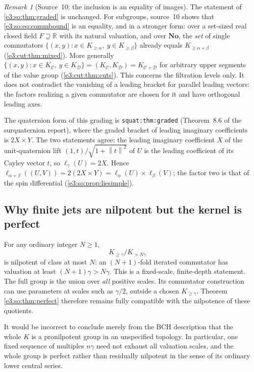\documentclass[11pt,letterpaper]{article}
\numberwithin{equation}{section}
\theoremstyle{definition}
\theoremstyle{remark}
\newtheorem{remark}[remark]{Remark}
\newcommand{\No}{\mathbf{No}}
\newcommand{\R}{\mathbb R}
\newcommand{\norm}[1]{\left\lVert#1\right\rVert}
\newcommand{\comm}[2]{\left(#1,#2\right)}
\newcommand{\commset}[2]{\{\comm{x}{y}:x\in #1,\ y\in #2\}}
\begin{document}
\begin{remark}[Source~10: the inclusion is an equality of images]\label{e3:cut:rem:gradedequality}
The statement of \cref{e3:so:thm:graded} is unchanged. For subgroups,
source~10 shows that \cref{e3:so:eq:commbound} is an equality, and in a
stronger form: over a set-sized real closed field $F\supseteq\R$ with its
natural valuation, and over $\No$, the \emph{set} of single commutators
$\commset{K_{\ge\alpha}}{K_{\ge\beta}}$ already equals $K_{\ge\alpha+\beta}$
(\cref{e3:cut:thm:mixed}). More generally
$\commset{K_{\mathcal C}}{K_{\mathcal D}}=\comm{K_{\mathcal C}}{K_{\mathcal D}}
=K_{\mathcal C+\mathcal D}$ for arbitrary upper segments of the value group
(\cref{e3:cut:thm:cuts}). This concerns the filtration levels only. It does not
contradict the vanishing of a leading bracket for parallel leading vectors: the
factors realizing a given commutator are chosen for it and have orthogonal
leading axes.
\end{remark}

The quaternion form of this grading is \texttt{squat:thm:graded} (Theorem~8.6 of
the surquaternion report), where the graded bracket of leading imaginary
coefficients is \(2X\times Y\). The two statements agree: the leading
imaginary coefficient \(X\) of the unit-quaternion lift \((1,t)/\sqrt{1+\norm t^2}\)
of \(U\) is the leading coefficient of its Cayley vector \(t\), so
\(\ell_\gamma(U)=2X\). Hence
\(\ell_{\alpha+\beta}(\comm UV)=2(2X\times Y)=\ell_\alpha(U)\times\ell_\beta(V)\);
the factor two is that of the spin differential (\cref{e3:so:prop:liesimple}).

\subsection{Why finite jets are nilpotent but the kernel is perfect}

For any ordinary integer \(N\ge1\),
\[
 K_{\ge\gamma}/K_{>N\gamma}
\]
is nilpotent of class at most \(N\): an \((N+1)\)-fold iterated commutator has
valuation at least \((N+1)\gamma>N\gamma\). This is a fixed-scale,
finite-depth statement. The full group is the union over \emph{all} positive
scales. Its commutator construction can use parameters at scales such as
\(\gamma/2\), outside a chosen \(K_{\ge\gamma}\). Theorem \ref{e3:so:thm:perfect}
therefore remains fully compatible with the nilpotence of these quotients.

It would be incorrect to conclude merely from the BCH description that the
whole \(K\) is a pronilpotent group in an unspecified topology. In particular,
one fixed sequence of multiples \(n\gamma\) need not exhaust all valuation
scales, and the whole group is perfect rather than residually nilpotent in the
sense of its ordinary lower central series.
\end{document}
